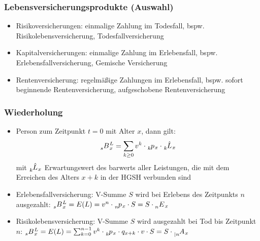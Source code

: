 \documentclass[12pt]{report}
\theoremstyle{dotless}
\theoremstyle{definition}
\begin{document}
\subsubsection{Lebensversicherungsprodukte (Auswahl)}
\begin{itemize}
\item Risikoversicherungen: einmalige Zahlung im Todesfall, bspw. Risikolebensversicherung, Todesfallversicherung
\item Kapitalversicherungen: einmalige Zahlung im Erlebensfall, bspw. Erlebensfallversicherung, Gemische Versicherung
\item Rentenversicherung: regelmäßige Zahlungen im Erlebensfall, bspw. sofort beginnende Rentenversicherung, aufgeschobene Rentenversicherung
\end{itemize}

\subsubsection{Wiederholung}
\begin{itemize}
\item Person zum Zeitpunkt $t=0$ mit Alter $x$, dann gilt:
\begin{equation}
\tensor[_{s}]{B}{}_x^L = \sum_{k\geq 0} v^k \cdot \tensor[_k]{p}{}_x \cdot \tensor[_k]{\hat{L}}{}_x
\end{equation}
mit $\tensor[_k]{\hat{L}}{}_x$ Erwartungswert des barwerts aller Leistungen, die mit dem Erreichen des Alters $x+k$ in der HGSH verbunden sind

\item Erlebensfallversicherung: V-Summe $S$ wird bei Erlebens des Zeitpunkts $n$ ausgezahlt: $\tensor[_{s}]{B}{}_x^L = E(L) = v^n \cdot \tensor[_n]{p}{}_x\cdot S = S \cdot \tensor[_n]{E}{}_x$
\item Risikolebensversicherung: V-Summe $S$ wird ausgezahlt bei Tod bis Zeitpunkt $n$: $\tensor[_{s}]{B}{}_x^L = E(L) = \sum_{k=0}^{n-1} v^k \cdot \tensor[_k]{p}{}_x \cdot q_{x+k} \cdot v \cdot S = S \cdot \tensor[_{|n}]{A}{}_x$
\end{itemize}
\end{document}
